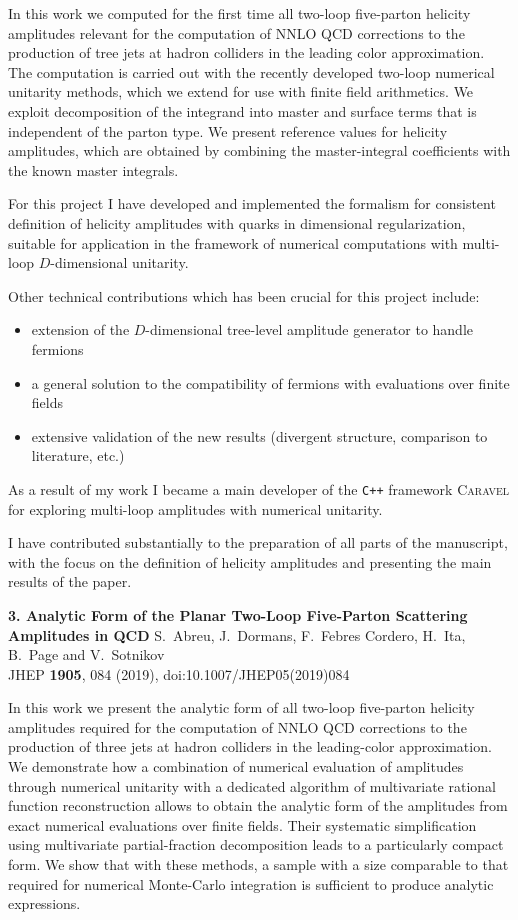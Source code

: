 \documentclass[a4paper,10pt]{article}
\newcommand{\paper}[1]{\vspace{3ex}\noindent\large\textbf{#1}\newline}
\begin{document}
  In this work we computed for the first time all two-loop five-parton helicity amplitudes relevant
  for the computation of NNLO QCD corrections to the production of tree jets at hadron colliders in the leading color approximation.
  The computation is carried out with the recently developed two-loop numerical unitarity methods, which we extend for use with finite field arithmetics.
  We exploit decomposition of the integrand into master and surface terms that is independent of the parton type.
  We present reference values for helicity amplitudes, which are obtained by combining the master-integral coefficients with the known master integrals.

  For this project I have developed and implemented the formalism for
  consistent definition of helicity amplitudes with quarks in dimensional regularization,
  suitable for application in the framework of numerical computations with multi-loop $D$-dimensional unitarity.

  Other technical contributions which has been crucial for this project include:
  \begin{itemize}
    \item extension of the $D$-dimensional tree-level amplitude generator to handle fermions
    \item a general solution to the compatibility of fermions with evaluations over finite fields
    \item extensive validation of the new results (divergent structure, comparison to literature, etc.\@)
  \end{itemize}
  As a result of my work I became a main developer of the \texttt{C++} framework \textsc{Caravel} for exploring multi-loop amplitudes
  with numerical unitarity.

  I have contributed substantially to the preparation of all parts of the manuscript,
  with the focus on the definition of helicity amplitudes and presenting the main results of the paper.

\paper{3. Analytic Form of the Planar Two-Loop Five-Parton Scattering Amplitudes in QCD}
S.~Abreu, J.~Dormans, F.~Febres Cordero, H.~Ita, B.~Page and V.~Sotnikov\\
JHEP {\bf 1905}, 084 (2019), doi:10.1007/JHEP05(2019)084

In this work we present the analytic form of all two-loop five-parton helicity amplitudes
required for the computation of NNLO QCD corrections to the production of three jets at hadron colliders
in the leading-color approximation.
We demonstrate how a combination of numerical evaluation of amplitudes through numerical unitarity with a
dedicated algorithm of multivariate rational function reconstruction allows to obtain
the analytic form of the amplitudes from exact numerical evaluations over finite fields.
Their systematic simplification using multivariate partial-fraction decomposition
leads to a particularly compact form. We show that with these methods, a sample with a size comparable to that
required for numerical Monte-Carlo integration is sufficient to produce analytic expressions.
\end{document}
